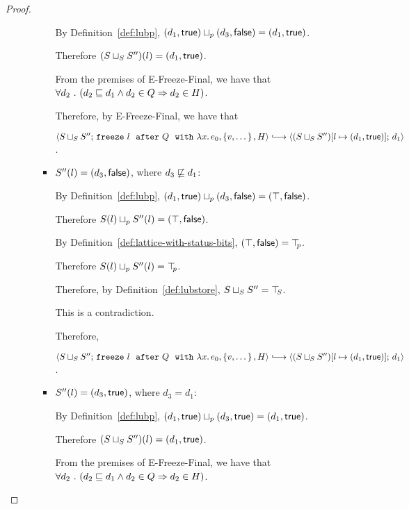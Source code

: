 \begin{proof}
\begin{itemize}
\begin{itemize}
\begin{itemize}
          By Definition~\ref{def:lubp},
          $(d_1, \textsf{true}) \sqcup_p (d_3, \textsf{false})
          = (d_1, \textsf{true})$.

          Therefore $(S \sqcup_{S} S'')(l) =
          (d_1, \textsf{true})$.

          From the premises of {\sc E-Freeze-Final}, we have that
          $\forall{d_2} ~.~ ( {d_2 \sqsubseteq d_1 \land d_2 \in Q} \Rightarrow d_2 \in
          H)$.

          Therefore, by {\sc E-Freeze-Final}, we have that

          $\config{\lubstore{S}{S''}}{\freezeafterfull{l}{Q}{\lam{x}{e_0}}{\setof{v,
                \dots}}{H}} \parstepsto
          \config{\extS{(\lubstore{S}{S''})}{l}{d_1}{\frozentrue}}{d_1}$.

        \item $S''(l) = (d_3, \textsf{false})$, where $d_3 \not \sqsubseteq d_1$:

          By Definition~\ref{def:lubp},
          $(d_1, \textsf{true}) \sqcup_p (d_3, \textsf{false})
          = (\top, \textsf{false})$.

          Therefore $S(l) \sqcup_p S''(l) =
          (\top, \textsf{false})$.

          By Definition~\ref{def:lattice-with-status-bits},
          $(\top, \textsf{false}) = \top\hspace{-0.85mm}_{p}$.

          Therefore $S(l) \sqcup_p S''(l) = \top\hspace{-0.85mm}_{p}$.

          Therefore, by Definition~\ref{def:lubstore},
          $S \sqcup_{S} S'' = \top\hspace{-0.85mm}_{S}$.

          This is a contradiction.

          Therefore,

          $\config{\lubstore{S}{S''}}{\freezeafterfull{l}{Q}{\lam{x}{e_0}}{\setof{v,
                \dots}}{H}} \parstepsto
          \config{\extS{(\lubstore{S}{S''})}{l}{d_1}{\frozentrue}}{d_1}$.

        \item $S''(l) = (d_3, \textsf{true})$, where $d_3 = d_1$:

          By Definition~\ref{def:lubp},
          $(d_1, \textsf{true}) \sqcup_p (d_3, \textsf{true}) =
          (d_1, \textsf{true})$.

          Therefore $(S \sqcup_{S} S'')(l) = (d_1, \textsf{true})$.

          From the premises of {\sc E-Freeze-Final}, we have that
          $\forall{d_2} ~.~ ( {d_2 \sqsubseteq d_1 \land d_2 \in Q} \Rightarrow d_2 \in
          H)$.


\end{itemize}
\end{itemize}
\end{itemize}
\end{proof}
